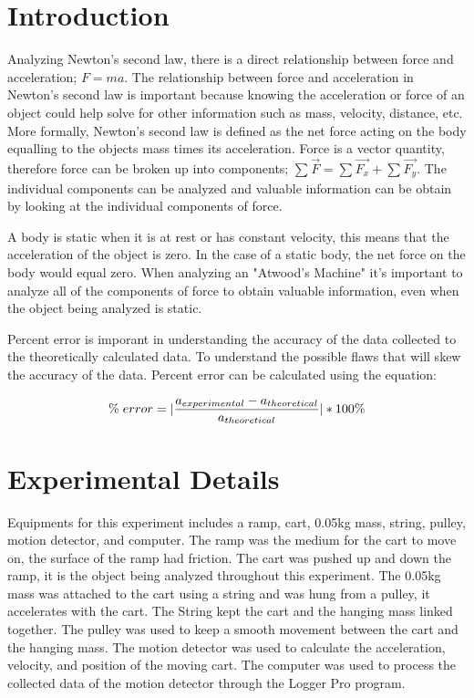 \documentclass[aps,letterpaper,11pt]{revtex4}
\begin{document}
\section{Introduction}

Analyzing Newton's second law, there is a direct relationship between force and acceleration; $F=ma.$ The relationship between force and acceleration in Newton's second law is important because knowing the acceleration or force of an object could help solve for other information such as mass, velocity, distance, etc. More formally, Newton's second law is defined as the net force acting on the body equalling to the objects mass times its acceleration. Force is a vector quantity, therefore force can be broken up into components; $\sum_{}^{}\vec{F} = \sum_{}^{}\vec{F_x} + \sum_{}^{}\vec{F_y}$. The individual components can be analyzed and valuable information can be obtain by looking at the individual components of force. 

A body is static when it is at rest or has constant velocity, this means that the acceleration of the object is zero. In the case of a static body, the net force on the body would equal zero. When analyzing an "Atwood's Machine" it's important to analyze all of the components of force to obtain valuable information, even when the object being analyzed is static.

Percent error is imporant in understanding the accuracy of the data collected to the theoretically calculated data. To understand the possible flaws that will skew the accuracy of the data. Percent error can be calculated using the equation:

$$ \% \hspace{1mm} error = |\frac{a_{experimental} - a_{theoretical}}{a_{theoretical}}|*100\%$$

\section{Experimental Details}

Equipments for this experiment includes a ramp, cart, 0.05kg mass, string, pulley, motion detector, and computer. The ramp was the medium for the cart to move on, the surface of the ramp had friction. The cart was pushed up and down the ramp, it is the object being analyzed throughout this experiment. The 0.05kg mass was attached to the cart using a string and was hung from a pulley, it accelerates with the cart. The String kept the cart and the hanging mass linked together. The pulley was used to keep a smooth movement between the cart and the hanging mass. The motion detector was used to calculate the acceleration, velocity, and position of the moving cart. The computer was used to process the collected data of the motion detector through the Logger Pro program. 
\end{document}
